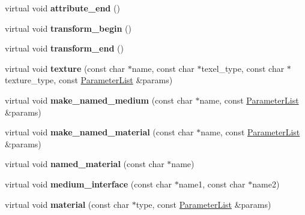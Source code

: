 \begin{DoxyCompactItemize}
virtual void {\bfseries attribute\+\_\+end} ()
\item 
\mbox{\label{structpbrt_1_1_fermat_importer_a07226ed16f0ae9c2825659b4d5160451}} 
virtual void {\bfseries transform\+\_\+begin} ()
\item 
\mbox{\label{structpbrt_1_1_fermat_importer_af6a37344c6acc2bca2e2abad5db0452b}} 
virtual void {\bfseries transform\+\_\+end} ()
\item 
\mbox{\label{structpbrt_1_1_fermat_importer_a1a649e7181d04a740ae76cfa90608982}} 
virtual void {\bfseries texture} (const char $\ast$name, const char $\ast$texel\+\_\+type, const char $\ast$texture\+\_\+type, const \hyperlink{structpbrt_1_1_parameter_list}{Parameter\+List} \&params)
\item 
\mbox{\label{structpbrt_1_1_fermat_importer_a759845459708189e797944d1b28ae135}} 
virtual void {\bfseries make\+\_\+named\+\_\+medium} (const char $\ast$name, const \hyperlink{structpbrt_1_1_parameter_list}{Parameter\+List} \&params)
\item 
\mbox{\label{structpbrt_1_1_fermat_importer_a803089b10ebf40da89be695659b933de}} 
virtual void {\bfseries make\+\_\+named\+\_\+material} (const char $\ast$name, const \hyperlink{structpbrt_1_1_parameter_list}{Parameter\+List} \&params)
\item 
\mbox{\label{structpbrt_1_1_fermat_importer_ab3f7930db38f6fe7483bb1efb66c9293}} 
virtual void {\bfseries named\+\_\+material} (const char $\ast$name)
\item 
\mbox{\label{structpbrt_1_1_fermat_importer_a49dbdff3adf28f650905c284ae5e8916}} 
virtual void {\bfseries medium\+\_\+interface} (const char $\ast$name1, const char $\ast$name2)
\item 
\mbox{\label{structpbrt_1_1_fermat_importer_af0943810b0f02c709ca9ffb44de25fbd}} 
virtual void {\bfseries material} (const char $\ast$type, const \hyperlink{structpbrt_1_1_parameter_list}{Parameter\+List} \&params)
\item 

\end{DoxyCompactItemize}
